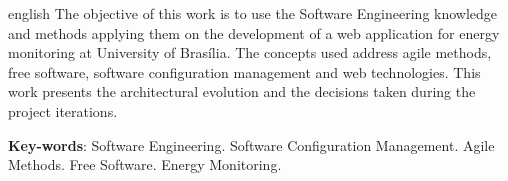\begin{resumo}[Abstract]
 \begin{otherlanguage*}{english}
   The objective of this work is to use the Software Engineering knowledge and methods applying them on the development of a web application for energy monitoring at University of Brasília. The concepts used address agile methods, free software, software configuration management and web technologies. This work presents the architectural evolution and the decisions taken during the project iterations.

   \vspace{\onelineskip}

   \noindent
   \textbf{Key-words}: Software Engineering. Software Configuration Management. Agile Methods. Free Software. Energy Monitoring.
 \end{otherlanguage*}
\end{resumo}

